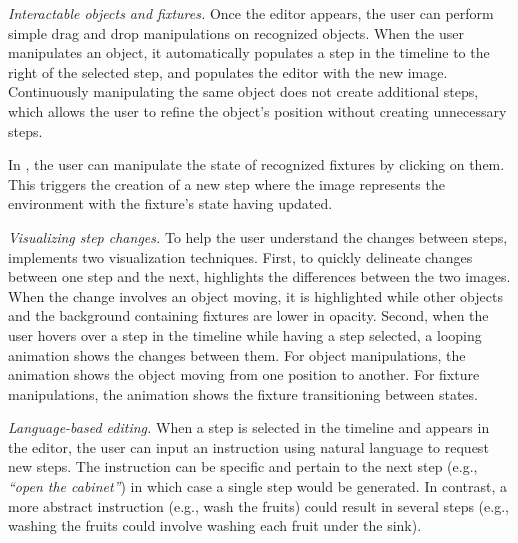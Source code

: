 
\noindent \emph{Interactable objects and fixtures.} Once the editor appears, the user can perform simple drag and drop manipulations on recognized objects. When the user manipulates an object, it automatically populates a step in the timeline to the right of the selected step, and populates the editor with the new image. Continuously manipulating the same object does not create additional steps, which allows the user to refine the object's position without creating unnecessary steps.

In \projname, the user can manipulate the state of recognized fixtures by clicking on them. This triggers the creation of a new step where the image represents the environment with the fixture's state having updated.

\noindent \emph{Visualizing step changes.} To help the user understand the changes between steps, \projname implements two visualization techniques. First, to quickly delineate changes between one step and the next, \projname highlights the differences between the two images. When the change involves an object moving, it is highlighted while other objects and the background containing fixtures are lower in opacity. Second, when the user hovers over a step in the timeline while having a step selected, a looping animation shows the changes between them. For object manipulations, the animation shows the object moving from one position to another. For fixture manipulations, the animation shows the fixture transitioning between states.

\noindent \emph{Language-based editing.} When a step is selected in the timeline and appears in the editor, the user can input an instruction using natural language to request new steps. The instruction can be specific and pertain to the next step (e.g., \textit{``open the cabinet''}) in which case a single step would be generated. In contrast, a more abstract instruction (e.g., wash the fruits) could result in several steps (e.g., washing the fruits could involve washing each fruit under the sink).

